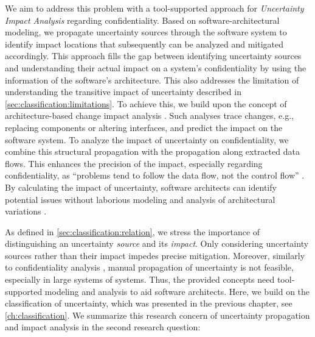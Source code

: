 We aim to address this problem with a tool-supported approach for \emph{Uncertainty Impact Analysis} regarding confidentiality.
Based on software-architectural modeling, we propagate uncertainty sources through the software system to identify impact locations that subsequently can be analyzed and mitigated accordingly.
This approach fills the gap between identifying uncertainty sources and understanding their actual impact on a system's confidentiality by using the information of the software's architecture.
This also addresses the limitation of understanding the transitive impact of uncertainty described in \autoref{sec:classification:limitations}.
To achieve this, we build upon the concept of architecture-based change impact analysis \cite{heinrich_methodology_2018,rostami_architecture-based_2015,rostami_architecture-based_2017}.
Such analyses trace changes, e.g., replacing components or altering interfaces, and predict the impact on the software system.
To analyze the impact of uncertainty on confidentiality, we combine this structural propagation with the propagation along extracted data flows.
This enhances the precision of the impact, especially regarding confidentiality, as \enquote{problems tend to follow the data flow, not the control flow} \cite{shostack_threat_2014}.
By calculating the impact of uncertainty, software architects can identify potential issues without laborious modeling and analysis of architectural variations \cite{hahner_model-based_2023,walter_architecture-based_2023}.

As defined in \autoref{sec:classification:relation}, we stress the importance of distinguishing an uncertainty \emph{source} and its \emph{impact}.
Only considering uncertainty sources rather than their impact impedes precise mitigation.
Moreover, similarly to confidentiality analysis \cite{seifermann_data-driven_2019}, manual propagation of uncertainty is not feasible, especially in large systems of systems.
Thus, the provided concepts need tool-supported modeling and analysis to aid software architects.
Here, we build on the classification of uncertainty, which was presented in the previous chapter, see \autoref{ch:classification}.
We summarize this research concern of uncertainty propagation and impact analysis in the second research question:

\RQtwo

